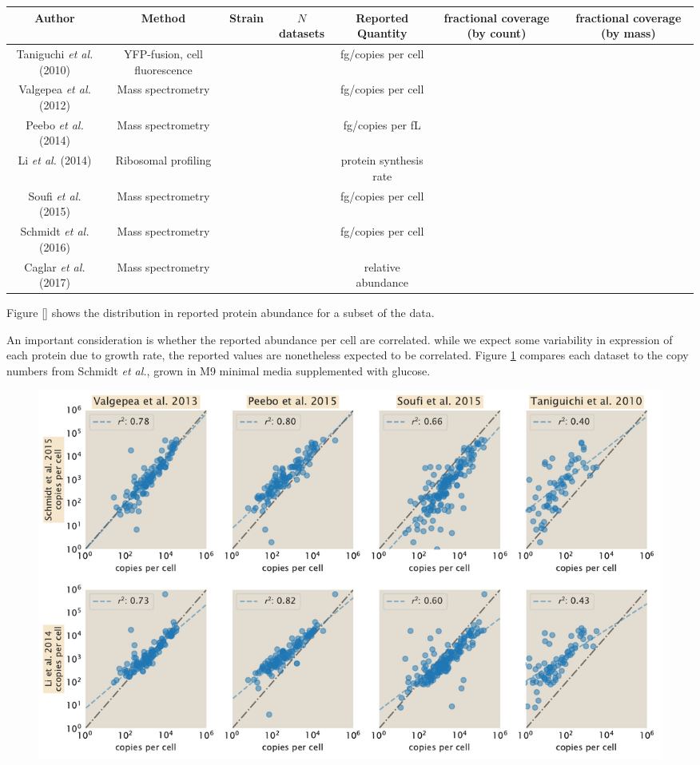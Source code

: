 \documentclass[11pt]{article}
\begin{document}
\begin{tabularx}{.8\textwidth}{ || c | c | c | c | c | c | c || }
\hline
Author & Method & Strain & $N$ datasets & Reported Quantity & fractional coverage (by count) & fractional coverage (by mass) \\
\hline\hline
Taniguchi {\it et al.} (2010) & YFP-fusion, cell fluorescence  & & & fg/copies per cell & & \\
\hline
Valgepea {\it et al.} (2012) & Mass spectrometry  & & & fg/copies per cell & & \\
\hline
Peebo {\it et al.} (2014) & Mass spectrometry  & & & fg/copies per fL & & \\
\hline
Li {\it et al.} (2014) & Ribosomal profiling  & & & protein synthesis rate & & \\
\hline
Soufi {\it et al.} (2015) & Mass spectrometry  & & & fg/copies per cell & &\\
\hline
Schmidt {\it et al.} (2016) & Mass spectrometry  & & & fg/copies per cell & & \\
\hline
Caglar {\it et al.} (2017) & Mass spectrometry  & & & relative abundance & &\\
\hline
\end{tabularx}

Figure \ref{} shows the distribution in reported protein abundance for   a  subset
of  the data.

An important consideration is whether the reported abundance per cell are correlated. while
we expect some variability in expression of each protein due to growth rate, the reported
values are nonetheless expected to be correlated. Figure \ref{fig:dataset_correlations} compares each dataset to the copy numbers from Schmidt {\it et al.}, grown in M9 minimal media supplemented with glucose.

\begin{figure}[H]
		\centering
    \includegraphics[width=1\textwidth]{../../figures/dataset_correlations.pdf}
  \caption{}
  \label{fig:dataset_correlations}
\end{figure}
\end{document}
